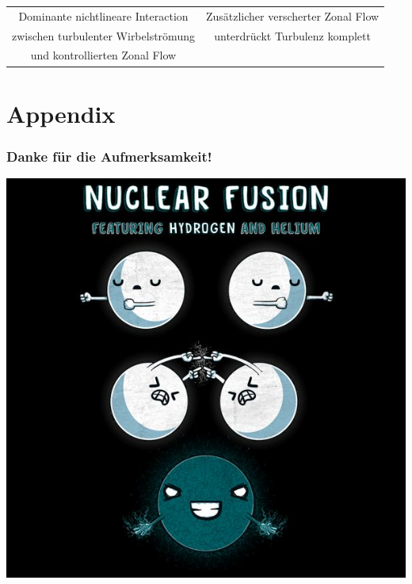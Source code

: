 \documentclass[compress,aspectratio=43]{beamer}
\begin{document}
\begin{frame}
\begin{tabular}{c c}
			Dominante nichtlineare Interaction  & Zusätzlicher verscherter Zonal Flow \\
			zwischen turbulenter Wirbelströmung & unterdrückt Turbulenz komplett \\
			und kontrollierten Zonal Flow & \\
		\end{tabular}
	\end{frame}


	\appendix
	\section*{Appendix}
	\begin{frame}
		\frametitle{Danke für die Aufmerksamkeit!}
		\includegraphics[scale = 0.3]{Presentation/Fusion_Meme.jpeg} \\
	\end{frame}
\end{document}
